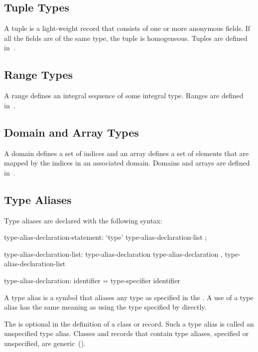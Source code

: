 \subsection{Tuple Types}
\label{Tuple_Types}

A tuple is a light-weight record that consists of one or more
anonymous fields.  If all the fields are of the same type, the tuple
is homogeneous.  Tuples are defined in~.

\subsection{Range Types}

A range defines an integral sequence of some integral type.  Ranges
are defined in~.

\subsection{Domain and Array Types}
\label{Domain_and_Array_Types}

A domain defines a set of indices and an array defines a set of
elements that are mapped by the indices in an associated domain.
Domains and arrays are defined in~.

\subsection{Type Aliases}
\label{Type_Aliases}

Type aliases are declared with the following syntax:
\begin{syntax}
type-alias-declaration-statement:
  `type' type-alias-declaration-list ;

type-alias-declaration-list:
  type-alias-declaration
  type-alias-declaration , type-alias-declaration-list

type-alias-declaration:
  identifier = type-specifier
  identifier
\end{syntax}
A type alias is a symbol that aliases any type as specified in the
.  A use of a type alias has the same meaning as using
the type specified by  directly.

The  is optional in the definition of a class or
record.  Such a type alias is called an unspecified type
alias. Classes and records that contain type aliases, specified or
unspecified, are generic~().

